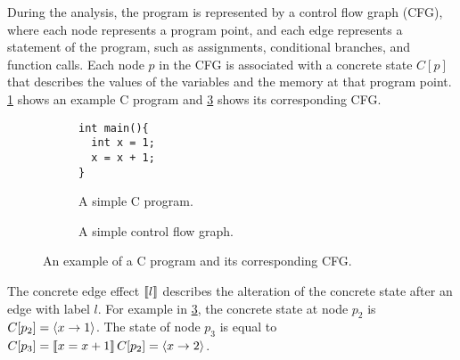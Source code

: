 During the analysis, the program is represented by a control flow graph (CFG), where each node represents a program point, and each edge represents a statement of the program,
such as assignments, conditional branches, and function calls.
Each node $p$ in the CFG is associated with a concrete state $C[p]$ that describes the values of the variables and the memory at that program point.
\cref{fig:example-C-program} shows an example C program and \cref{fig:example-CFG} shows its corresponding CFG.

\begin{figure}\begin{subfigure}{0.45\textwidth}

    \begin{verbatim}
int main(){
  int x = 1;
  x = x + 1;
}
\end{verbatim}
    \caption{A simple C program.}\label{fig:example-C-program}
  \end{subfigure}
  \begin{subfigure}{0.45\textwidth}

    \caption{A simple control flow graph.}\label{fig:example-CFG}
  \end{subfigure}

  \caption{An example of a C program and its corresponding CFG.}


\end{figure}

The concrete edge effect $\llbracket l\rrbracket$ describes the alteration of the concrete state after an edge with label $l$.
For example in \cref{fig:example-CFG}, the concrete state at node $p_2$ is $C[p_2] = \langle x \rightarrow 1\rangle$.
The state of node $p_3$ is equal to $C[p_3] = \llbracket x = x+1\rrbracket\,C[p_2] = \langle x \rightarrow 2\rangle$.

